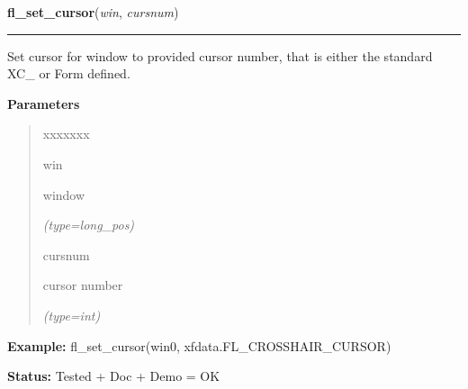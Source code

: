     \vspace{0.5ex}

\hspace{.8\funcindent}\begin{boxedminipage}{\funcwidth}

    \raggedright \textbf{fl\_set\_cursor}(\textit{win}, \textit{cursnum})

    \vspace{-1.5ex}

    \rule{\textwidth}{0.5\fboxrule}
\setlength{\parskip}{2ex}
    Set cursor for window to provided cursor number, that is either the 
    standard XC\_ or Form defined.

\setlength{\parskip}{1ex}
      \textbf{Parameters}
      \vspace{-1ex}

      \begin{quote}
        \begin{Ventry}{xxxxxxx}

          \item[win]

          window

            {\it (type=long\_pos)}

          \item[cursnum]

          cursor number

            {\it (type=int)}

        \end{Ventry}

      \end{quote}

\textbf{Example:} fl\_set\_cursor(win0, xfdata.FL\_CROSSHAIR\_CURSOR)



\textbf{Status:} Tested + Doc + Demo = OK



    \end{boxedminipage}

    \label{xformslib:flcursor:fl_set_cursor_color}

    \vspace{0.5ex}

